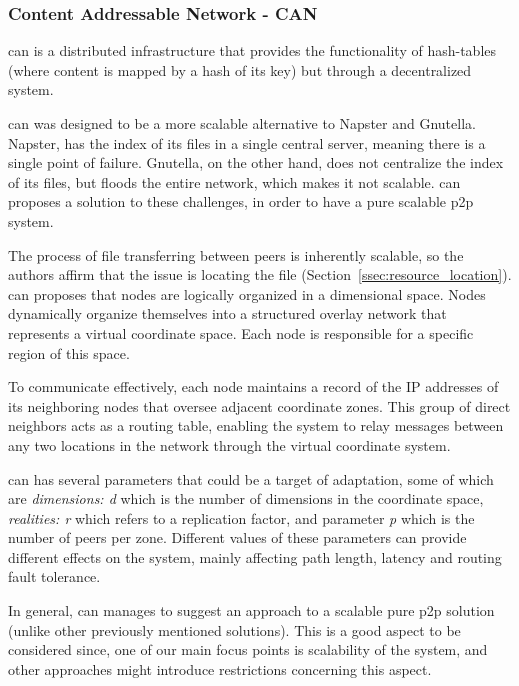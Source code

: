 \subsubsection{Content Addressable Network - CAN}
\label{sssec:can}
\par \gls{can} \cite{Ratnasamy2001} is a distributed infrastructure that provides the functionality of hash-tables (where content is mapped by a hash of its key) but through a decentralized system.
\par \gls{can} was designed to be a more scalable alternative to Napster and Gnutella. Napster, has the index of its files in a single central server, meaning there is a single point of failure. Gnutella, on the other hand, does not centralize the index of its files, but floods the entire network, which makes it not scalable. \gls{can} proposes a solution to these challenges, in order to have a pure scalable \gls{p2p} system.
\par The process of file transferring between peers is inherently scalable, so the authors affirm that the issue is locating the file (Section~\ref{ssec:resource_location}). \gls{can} proposes that nodes are logically organized in a dimensional space. Nodes dynamically organize themselves into a structured overlay network that represents a virtual coordinate space. Each node is responsible for a specific region of this space.
\par To communicate effectively, each node maintains a record of the IP addresses of its neighboring nodes that oversee adjacent coordinate zones. This group of direct neighbors acts as a routing table, enabling the system to relay messages between any two locations in the network through the virtual coordinate system.
\par \gls{can} has several parameters that could be a target of adaptation, some of which are \textit{dimensions: d} which is the number of dimensions in the coordinate space, \textit{realities: r} which refers to a replication factor, and parameter \textit{p} which is the number of peers per zone. Different values of these parameters can provide different effects on the system, mainly affecting path length, latency and routing fault tolerance.%
\par In general, \gls{can} manages to suggest an approach to a scalable pure \gls{p2p} solution (unlike other previously mentioned solutions). This is a good aspect to be considered since, one of our main focus points is scalability of the system, and other approaches might introduce restrictions concerning this aspect. %
%
%
%
